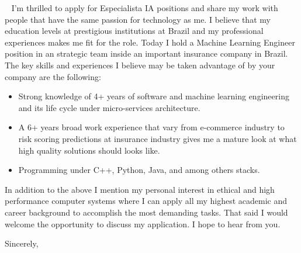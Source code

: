 \documentclass{scrlttr2}
\begin{document}
\begin{letter}{~ %
  }
  I’m thrilled to apply for Especialista IA positions and share my work with
  people that have the same passion for technology as me.  I believe that my
  education levels at prestigious institutions at Brazil and my professional
  experiences makes me fit for the role.  Today I hold a Machine Learning
  Engineer position in an strategic team inside an important insurance company
  in Brazil. The key skills and experiences I believe may be taken advantage of
  by your company are the following:

  \begin{itemize}
  \item Strong knowledge of 4+ years of software and machine learning
    engineering and its life cycle under micro-services architecture.
  \item A 6+ years broad work experience that vary from e-commerce industry to
    risk scoring predictions at insurance industry gives me a mature look at
    what high quality solutions should looks like.
  \item Programming under C++, Python, Java, and among others stacks.
  \end{itemize}

  In addition to the above I mention my personal interest in ethical and high
  performance computer systems where I can apply all my highest academic and
  career background to accomplish the most demanding tasks. That said I would
  welcome the opportunity to discuss my application. I hope to hear from you.

  \closing{Sincerely,}


\end{letter}
\end{document}
